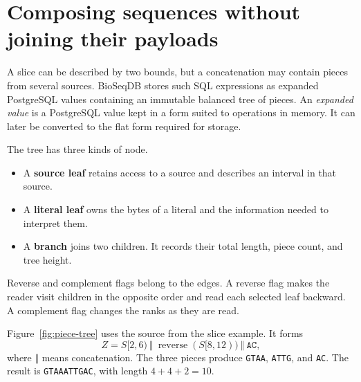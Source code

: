 \section{Composing sequences without joining their payloads}
\label{sec:sequence-piece-tree}

A slice can be described by two bounds, but a concatenation may contain pieces
from several sources. BioSeqDB stores such SQL expressions as expanded
PostgreSQL values containing an immutable balanced tree of pieces. An
\emph{expanded value} is a PostgreSQL value kept in a form suited to operations
in memory. It can later be converted to the flat form required for storage.

The tree has three kinds of node.
\begin{itemize}
  \item A \textbf{source leaf} retains access to a source and describes an
        interval in that source.
  \item A \textbf{literal leaf} owns the bytes of a literal and the information
        needed to interpret them.
  \item A \textbf{branch} joins two children. It records their total length,
        piece count, and tree height.
\end{itemize}
Reverse and complement flags belong to the edges. A reverse flag makes the
reader visit children in the opposite order and read each selected leaf
backward. A complement flag changes the ranks as they are read.

Figure~\ref{fig:piece-tree} uses the source from the slice example. It forms
\[
  Z=S[2,6)\ \Vert\ \operatorname{reverse}(S[8,12))\ \Vert\ \texttt{AC},
\]
where \(\Vert\) means concatenation. The three pieces produce
\texttt{GTAA}, \texttt{ATTG}, and \texttt{AC}. The result is
\texttt{GTAAATTGAC}, with length \(4+4+2=10\).

